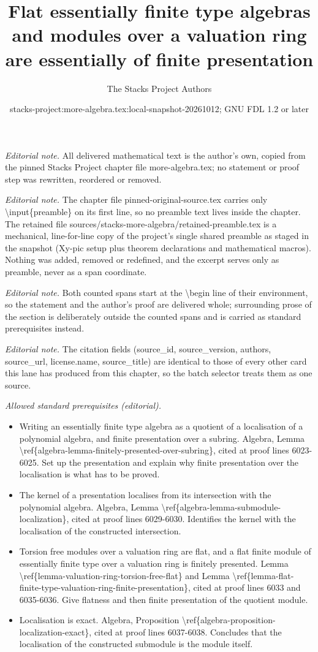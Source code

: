 \documentclass[10pt,a4paper]{amsart}
\title{Flat essentially finite type algebras and modules over a valuation ring are essentially of finite presentation}
\author{The Stacks Project Authors}
\date{stacks-project:more-algebra.tex:local-snapshot-20261012; GNU FDL 1.2 or later}
\theoremstyle{plain}
\theoremstyle{definition}
\theoremstyle{remark}
\numberwithin{equation}{subsection}
\begin{document}
\maketitle
\setcounter{subsection}{1}
\noindent\textit{Editorial note.} All delivered mathematical text is the author's own, copied from the pinned Stacks Project chapter file more-algebra.tex; no statement or proof step was rewritten, reordered or removed.\par\medskip
\noindent\textit{Editorial note.} The chapter file pinned-original-source.tex carries only \textbackslash{}input\{preamble\} on its first line, so no preamble text lives inside the chapter. The retained file sources/stacks-more-algebra/retained-preamble.tex is a mechanical, line-for-line copy of the project's single shared preamble as staged in the snapshot (Xy-pic setup plus theorem declarations and mathematical macros). Nothing was added, removed or redefined, and the excerpt serves only as preamble, never as a span coordinate.\par\medskip
\noindent\textit{Editorial note.} Both counted spans start at the \textbackslash{}begin line of their environment, so the statement and the author's proof are delivered whole; surrounding prose of the section is deliberately outside the counted spans and is carried as standard prerequisites instead.\par\medskip
\noindent\textit{Editorial note.} The citation fields (source\_id, source\_version, authors, source\_url, license.name, source\_title) are identical to those of every other card this lane has produced from this chapter, so the batch selector treats them as one source.\par\medskip
\noindent\textit{Allowed standard prerequisites (editorial).}\begin{itemize}
\item Writing an essentially finite type algebra as a quotient of a localisation of a polynomial algebra, and finite presentation over a subring. Algebra, Lemma \textbackslash{}ref\{algebra-lemma-finitely-presented-over-subring\}, cited at proof lines 6023-6025. Set up the presentation and explain why finite presentation over the localisation is what has to be proved.
\item The kernel of a presentation localises from its intersection with the polynomial algebra. Algebra, Lemma \textbackslash{}ref\{algebra-lemma-submodule-localization\}, cited at proof lines 6029-6030. Identifies the kernel with the localisation of the constructed intersection.
\item Torsion free modules over a valuation ring are flat, and a flat finite module of essentially finite type over a valuation ring is finitely presented. Lemma \textbackslash{}ref\{lemma-valuation-ring-torsion-free-flat\} and Lemma \textbackslash{}ref\{lemma-flat-finite-type-valuation-ring-finite-presentation\}, cited at proof lines 6033 and 6035-6036. Give flatness and then finite presentation of the quotient module.
\item Localisation is exact. Algebra, Proposition \textbackslash{}ref\{algebra-proposition-localization-exact\}, cited at proof lines 6037-6038. Concludes that the localisation of the constructed submodule is the module itself.
\end{itemize}\medskip
\end{document}
